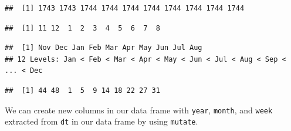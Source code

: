 \documentclass[
]{book}
\newenvironment{Shaded}{\begin{snugshade}}{\end{snugshade}}
\newcommand{\CommentTok}[1]{\textcolor[rgb]{0.56,0.35,0.01}{\textit{#1}}}
\newcommand{\DataTypeTok}[1]{\textcolor[rgb]{0.13,0.29,0.53}{#1}}
\newcommand{\DecValTok}[1]{\textcolor[rgb]{0.00,0.00,0.81}{#1}}
\newcommand{\KeywordTok}[1]{\textcolor[rgb]{0.13,0.29,0.53}{\textbf{#1}}}
\newcommand{\NormalTok}[1]{#1}
\newcommand{\OperatorTok}[1]{\textcolor[rgb]{0.81,0.36,0.00}{\textbf{#1}}}
\newcommand{\OtherTok}[1]{\textcolor[rgb]{0.56,0.35,0.01}{#1}}
\newcommand{\StringTok}[1]{\textcolor[rgb]{0.31,0.60,0.02}{#1}}
\begin{document}
\begin{verbatim}
##  [1] 1743 1743 1744 1744 1744 1744 1744 1744 1744 1744
\end{verbatim}

\begin{Shaded}
\end{Shaded}

\begin{verbatim}
##  [1] 11 12  1  2  3  4  5  6  7  8
\end{verbatim}

\begin{Shaded}
\end{Shaded}

\begin{verbatim}
##  [1] Nov Dec Jan Feb Mar Apr May Jun Jul Aug
## 12 Levels: Jan < Feb < Mar < Apr < May < Jun < Jul < Aug < Sep < ... < Dec
\end{verbatim}

\begin{Shaded}
\end{Shaded}

\begin{verbatim}
##  [1] 44 48  1  5  9 14 18 22 27 31
\end{verbatim}

We can create new columns in our data frame with \texttt{year}, \texttt{month}, and \texttt{week} extracted from \texttt{dt} in our data frame by using \texttt{mutate}.

\begin{Shaded}
\end{Shaded}
\end{document}
